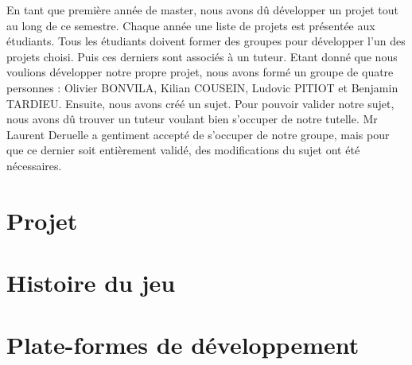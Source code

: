 En tant que première année de master, nous avons dû développer un projet tout au long de ce semestre. Chaque année une liste de projets est présentée aux étudiants. Tous les étudiants doivent former des groupes pour développer l'un des projets choisi. Puis ces derniers sont associés à un tuteur. Etant donné que nous voulions développer notre propre projet, nous avons formé un groupe de quatre personnes : Olivier BONVILA, Kilian COUSEIN, Ludovic PITIOT et Benjamin TARDIEU. Ensuite, nous avons créé un sujet. Pour pouvoir valider notre sujet, nous avons dû trouver un tuteur voulant bien s'occuper de notre tutelle. Mr Laurent Deruelle a gentiment accepté de s'occuper de notre groupe, mais pour que ce dernier soit entièrement validé, des modifications du sujet ont été nécessaires.

\section{Projet}	
	
	
\section{Histoire du jeu}
	

\section{Plate-formes de développement}
	
